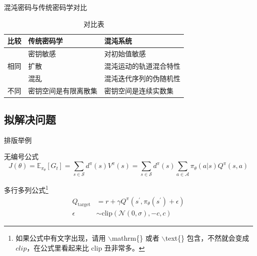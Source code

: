 \documentclass{beamer}
\begin{document}
\begin{frame}{混沌密码与传统密码学对比}
    \begin{table}[h]
        \centering
        \caption{对比表}
        \begin{tabular}{|l|l|l|}
        \hline
        比较                  & 传统密码学      & 混沌系统        \\ \hline
        \multirow{3}{*}{相同} & 密钥敏感       & 对初始值敏感      \\ \cline{2-3} 
                            & 扩散         & 混沌运动的轨道混合特性 \\ \cline{2-3} 
                            & 混乱         & 混沌迭代序列的伪随机性 \\ \hline
        不同                  & 密钥空间是有限离散集 & 密钥空间是连续实数集  \\ \hline
        \end{tabular}
        
    \end{table}
\end{frame}

\subsection{拟解决问题}

\begin{frame}{排版举例}
    \begin{exampleblock}{无编号公式} %
        \begin{equation*}
            J(\theta) = \mathbb{E}_{\pi_\theta}[G_t] = \sum_{s\in\mathcal{S}} d^\pi (s)V^\pi(s)=\sum_{s\in\mathcal{S}} d^\pi(s)\sum_{a\in\mathcal{A}}\pi_\theta(a|s)Q^\pi(s,a)
        \end{equation*}
    \end{exampleblock}
    \begin{exampleblock}{多行多列公式\footnote{如果公式中有文字出现，请用 $\backslash$mathrm\{\} 或者 $\backslash$text\{\} 包含，不然就会变成 $clip$，在公式里看起来比 $\mathrm{clip}$ 丑非常多。}}
        \begin{align}
            Q_\mathrm{target}&=r+\gamma Q^\pi(s^\prime, \pi_\theta(s^\prime)+\epsilon)\\
            \epsilon&\sim\mathrm{clip}(\mathcal{N}(0, \sigma), -c, c)\nonumber
        \end{align}
    \end{exampleblock}
\end{frame}
\end{document}

